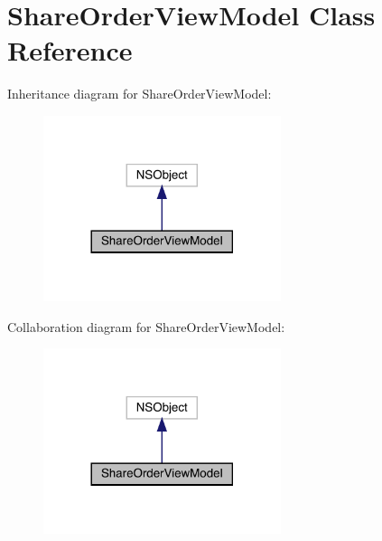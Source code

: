 \hypertarget{interface_share_order_view_model}{}\section{Share\+Order\+View\+Model Class Reference}
\label{interface_share_order_view_model}


Inheritance diagram for Share\+Order\+View\+Model\+:\nopagebreak
\begin{figure}[H]
\begin{center}
\leavevmode
\includegraphics[width=197pt]{interface_share_order_view_model__inherit__graph}
\end{center}
\end{figure}


Collaboration diagram for Share\+Order\+View\+Model\+:\nopagebreak
\begin{figure}[H]
\begin{center}
\leavevmode
\includegraphics[width=197pt]{interface_share_order_view_model__coll__graph}
\end{center}
\end{figure}
